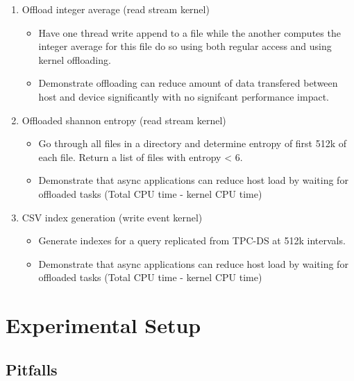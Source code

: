 \begin{enumerate}
    \item Offload integer average (read stream kernel)
    \begin{itemize}
        \item Have one thread write append to a file while the another computes
              the integer average for this file do so using both regular access
              and using kernel offloading.
        \item Demonstrate offloading can reduce amount of data transfered
              between host and device significantly with no signifcant
              performance impact.
    \end{itemize}
    \item Offloaded shannon entropy (read stream kernel)
    \begin{itemize}
        \item Go through all files in a directory and determine entropy of first
              512k of each file. Return a list of files with entropy < 6.
        \item Demonstrate that async applications can reduce host load by
              waiting for offloaded tasks (Total CPU time - kernel CPU time)
    \end{itemize}
    \item CSV index generation (write event kernel)
    \begin{itemize}
        \item Generate indexes for a query replicated from TPC-DS at 512k
              intervals.
        \item Demonstrate that async applications can reduce host load by
              waiting for offloaded tasks (Total CPU time - kernel CPU time)
    \end{itemize}
\end{enumerate}

\section{Experimental Setup}




\subsection{Pitfalls}

